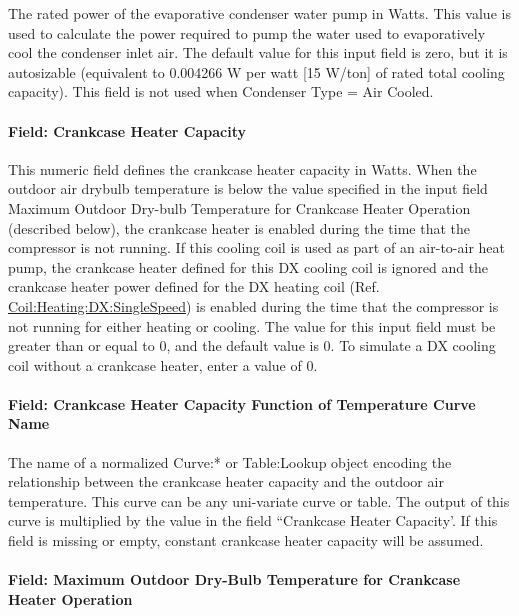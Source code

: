 The rated power of the evaporative condenser water pump in Watts. This value is used to calculate the power required to pump the water used to evaporatively cool the condenser inlet air. The default value for this input field is zero, but it is autosizable (equivalent to 0.004266 W per watt {[}15 W/ton{]} of rated total cooling capacity). This field is not used when Condenser Type = Air Cooled.

\paragraph{Field: Crankcase Heater Capacity}\label{field-crankcase-heater-capacity-3}

This numeric field defines the crankcase heater capacity in Watts. When the outdoor air drybulb temperature is below the value specified in the input field Maximum Outdoor Dry-bulb Temperature for Crankcase Heater Operation (described below), the crankcase heater is enabled during the time that the compressor is not running. If this cooling coil is used as part of an air-to-air heat pump, the crankcase heater defined for this DX cooling coil is ignored and the crankcase heater power defined for the DX heating coil (Ref. \hyperref[coilheatingdxsinglespeed]{Coil:Heating:DX:SingleSpeed}) is enabled during the time that the compressor is not running for either heating or cooling. The value for this input field must be greater than or equal to 0, and the default value is 0. To simulate a DX cooling coil without a crankcase heater, enter a value of 0.

\paragraph{Field: Crankcase Heater Capacity Function of Temperature Curve Name}

The name of a normalized Curve:* or Table:Lookup object encoding the relationship between the crankcase heater capacity and the outdoor air temperature. This curve can be any uni-variate curve or table. The output of this curve is multiplied by the value in the field ``Crankcase Heater Capacity'. If this field is missing or empty, constant crankcase heater capacity will be
assumed.

\paragraph{Field: Maximum Outdoor Dry-Bulb Temperature for Crankcase Heater Operation}\label{field-maximum-outdoor-dry-bulb-temperature-for-crankcase-heater-operation-3}

